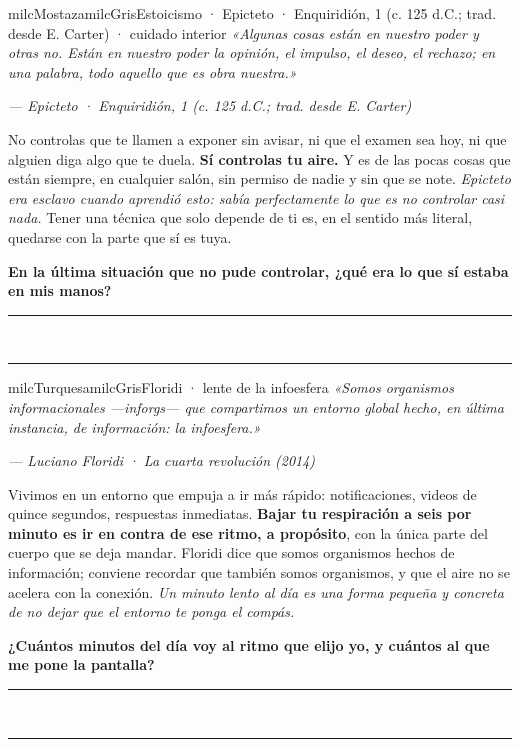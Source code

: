 \documentclass[11pt,letterpaper]{article}
\newcommand{\linead}[1]{\noindent\color{milcLinea}\rule{#1}{0.5pt}\color{milcNegro}}
\begin{document}
\begin{softbox}{milcMostaza}{milcGris}{Estoicismo · Epicteto · Enquiridión, 1 (c. 125 d.C.; trad. desde E. Carter) · cuidado interior}
\textit{«Algunas cosas están en nuestro poder y otras no. Están en nuestro poder la opinión, el impulso, el deseo, el rechazo; en una palabra, todo aquello que es obra nuestra.»}

{\footnotesize\itshape\color{milcNegro!70}--- Epicteto · Enquiridión, 1 (c. 125 d.C.; trad. desde E. Carter)}

No controlas que te llamen a exponer sin avisar, ni que el examen sea hoy, ni que alguien diga algo que te duela. \textbf{Sí controlas tu aire.} Y es de las pocas cosas que están siempre, en cualquier salón, sin permiso de nadie y sin que se note. \emph{Epicteto era esclavo cuando aprendió esto: sabía perfectamente lo que es no controlar casi nada.} Tener una técnica que solo depende de ti es, en el sentido más literal, quedarse con la parte que sí es tuya.

\textbf{En la última situación que no pude controlar, ¿qué era lo que sí estaba en mis manos?}
\end{softbox}
\linead{\linewidth}\\[1mm]
\linead{\linewidth}

\begin{softbox}{milcTurquesa}{milcGris}{Floridi · lente de la infoesfera}
\textit{«Somos organismos informacionales ---inforgs--- que compartimos un entorno global hecho, en última instancia, de información: la infoesfera.»}

{\footnotesize\itshape\color{milcNegro!70}--- Luciano Floridi · La cuarta revolución (2014)}

Vivimos en un entorno que empuja a ir más rápido: notificaciones, videos de quince segundos, respuestas inmediatas. \textbf{Bajar tu respiración a seis por minuto es ir en contra de ese ritmo, a propósito}, con la única parte del cuerpo que se deja mandar. Floridi dice que somos organismos hechos de información; conviene recordar que también somos organismos, y que el aire no se acelera con la conexión. \emph{Un minuto lento al día es una forma pequeña y concreta de no dejar que el entorno te ponga el compás.}

\textbf{¿Cuántos minutos del día voy al ritmo que elijo yo, y cuántos al que me pone la pantalla?}
\end{softbox}
\linead{\linewidth}\\[1mm]
\linead{\linewidth}
\end{document}

